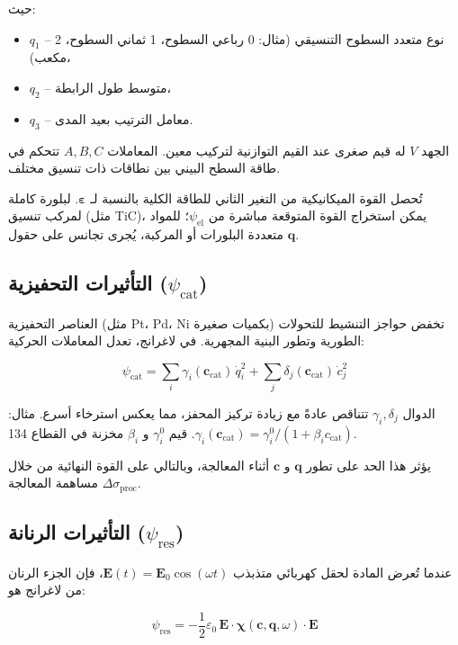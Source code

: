 \documentclass[11pt,a4paper]{article}
\begin{document}
\begin{otherlanguage}{arabic}
		حيث:
		\begin{itemize}
			\item \(q_1\) – نوع متعدد السطوح التنسيقي (مثال: 0 رباعي السطوح، 1 ثماني السطوح، 2 مكعب)،
			\item \(q_2\) – متوسط طول الرابطة،
			\item \(q_3\) – معامل الترتيب بعيد المدى.
		\end{itemize}
		
		الجهد \(V\) له قيم صغرى عند القيم التوازنية لتركيب معين. المعاملات \(A,B,C\) تتحكم في طاقة السطح البيني بين نطاقات ذات تنسيق مختلف.
		
		تُحصل القوة الميكانيكية من التغير الثاني للطاقة الكلية بالنسبة لـ \(\boldsymbol{\varepsilon}\). لبلورة كاملة لمركب تنسيق (مثل TiC)، يمكن استخراج القوة المتوقعة مباشرة من \(\psi_{\mathrm{el}}\)؛ للمواد متعددة البلورات أو المركبة، يُجرى تجانس على حقول \(\mathbf{q}\).
		
		\subsection{التأثيرات التحفيزية (\(\psi_{\mathrm{cat}}\))}
		\label{subsec:catalysis}
		
		العناصر التحفيزية (مثل Pt، Pd، Ni بكميات صغيرة) تخفض حواجز التنشيط للتحولات الطورية وتطور البنية المجهرية. في لاغرانج، تعدل المعاملات الحركية:
		
		\[
		\psi_{\mathrm{cat}} = \sum_i \gamma_i(\mathbf{c}_{\mathrm{cat}})\, \dot{q}_i^2 + \sum_j \delta_j(\mathbf{c}_{\mathrm{cat}})\, \dot{c}_j^2
		\]
		
		الدوال \(\gamma_i, \delta_j\) تتناقص عادةً مع زيادة تركيز المحفز، مما يعكس استرخاء أسرع. مثال: \(\gamma_i(\mathbf{c}_{\mathrm{cat}}) = \gamma_i^0 / (1 + \beta_i c_{\mathrm{cat}})\). قيم \(\gamma_i^0\) و \(\beta_i\) مخزنة في القطاع 134.
		
		يؤثر هذا الحد على تطور \(\mathbf{q}\) و \(\mathbf{c}\) أثناء المعالجة، وبالتالي على القوة النهائية من خلال مساهمة المعالجة \(\Delta\sigma_{\mathrm{proc}}\).
		
		\subsection{التأثيرات الرنانة (\(\psi_{\mathrm{res}}\))}
		\label{subsec:resonance}
		
		عندما تُعرض المادة لحقل كهربائي متذبذب \(\mathbf{E}(t) = \mathbf{E}_0 \cos(\omega t)\)، فإن الجزء الرنان من لاغرانج هو:
		
		\[
		\psi_{\mathrm{res}} = -\frac{1}{2}\varepsilon_0\, \mathbf{E} \cdot \boldsymbol{\chi}(\mathbf{c}, \mathbf{q}, \omega) \cdot \mathbf{E}
		\]
		

\end{otherlanguage}
\end{document}
